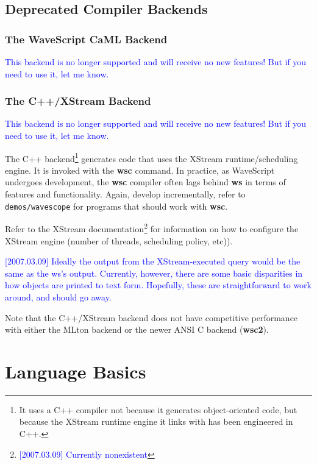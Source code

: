 \documentclass[twocolumn]{report}
\newcommand{\rednote}[1]{{\textcolor{blue}{#1}}}
\begin{document}
\section{Deprecated Compiler Backends}

\subsection{The WaveScript CaML Backend}

\rednote{This backend is no longer supported and will receive no new
  features!  But if you need to use it, let me know.}

\subsection{The C++/XStream Backend}

\rednote{This backend is no longer supported and will receive no new
  features!  But if you need to use it, let me know.}

The C++ backend\footnote{It uses a C++ compiler not because it
  generates object-oriented code, but because the XStream runtime engine it
  links with has been engineered in C++.} generates code that uses the
XStream runtime/scheduling engine.  It is invoked with the {\bf wsc}
command.  
In practice, as WaveScript undergoes development, the {\bf wsc}
compiler often lags behind {\bf ws} in terms of features and
functionality.  Again, develop incrementally, refer to {\tt
  demos/wavescope} for programs that should work with {\bf
  wsc}.

Refer to the XStream documentation\footnote{\rednote{[2007.03.09] Currently nonexistent}} 
for information on how to configure the XStream engine
(number of threads, scheduling policy, etc)).

\rednote{[2007.03.09] Ideally the output from the XStream-executed
query would be the same as the ws's output.  Currently, however, there are
some basic disparities in how objects are printed to text form.  Hopefully, these
are straightforward to work around, and should go away.}

Note that the C++/XStream backend does not have competitive performance with
either the MLton backend or the newer ANSI C backend ({\bf wsc2}).


\chapter{Language Basics}\label{s:lang}
\end{document}
